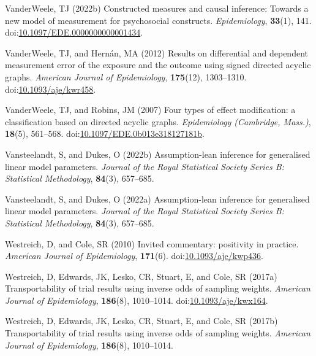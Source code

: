 \documentclass[
  single column]{article}
\newlength{\cslhangindent}
\newenvironment{CSLReferences}[2] %
 {\begin{list}{}{%
  \setlength{\itemindent}{0pt}
  \setlength{\leftmargin}{0pt}
  \setlength{\parsep}{0pt}
  \ifodd #1
   \setlength{\leftmargin}{\cslhangindent}
   \setlength{\itemindent}{-1\cslhangindent}
  \fi
  \setlength{\itemsep}{#2\baselineskip}}}
 {\end{list}}
\begin{document}
\begin{CSLReferences}{1}{0}
VanderWeele, TJ (2022b) Constructed measures and causal inference:
Towards a new model of measurement for psychosocial constructs.
\emph{Epidemiology}, \textbf{33}(1), 141.
doi:\href{https://doi.org/10.1097/EDE.0000000000001434}{10.1097/EDE.0000000000001434}.

VanderWeele, TJ, and Hernán, MA (2012) Results on differential and
dependent measurement error of the exposure and the outcome using signed
directed acyclic graphs. \emph{American Journal of Epidemiology},
\textbf{175}(12), 1303--1310.
doi:\href{https://doi.org/10.1093/aje/kwr458}{10.1093/aje/kwr458}.

VanderWeele, TJ, and Robins, JM (2007) Four types of effect
modification: a classification based on directed acyclic graphs.
\emph{Epidemiology (Cambridge, Mass.)}, \textbf{18}(5), 561--568.
doi:\href{https://doi.org/10.1097/EDE.0b013e318127181b}{10.1097/EDE.0b013e318127181b}.

Vansteelandt, S, and Dukes, O (2022b) Assumption-lean inference for
generalised linear model parameters. \emph{Journal of the Royal
Statistical Society Series B: Statistical Methodology}, \textbf{84}(3),
657--685.

Vansteelandt, S, and Dukes, O (2022a) Assumption-lean inference for
generalised linear model parameters. \emph{Journal of the Royal
Statistical Society Series B: Statistical Methodology}, \textbf{84}(3),
657--685.

Westreich, D, and Cole, SR (2010) Invited commentary: positivity in
practice. \emph{American Journal of Epidemiology}, \textbf{171}(6).
doi:\href{https://doi.org/10.1093/aje/kwp436}{10.1093/aje/kwp436}.

Westreich, D, Edwards, JK, Lesko, CR, Stuart, E, and Cole, SR (2017a)
Transportability of trial results using inverse odds of sampling
weights. \emph{American Journal of Epidemiology}, \textbf{186}(8),
1010--1014.
doi:\href{https://doi.org/10.1093/aje/kwx164}{10.1093/aje/kwx164}.

Westreich, D, Edwards, JK, Lesko, CR, Stuart, E, and Cole, SR (2017b)
Transportability of trial results using inverse odds of sampling
weights. \emph{American Journal of Epidemiology}, \textbf{186}(8),
1010--1014.

\end{CSLReferences}
\end{document}
